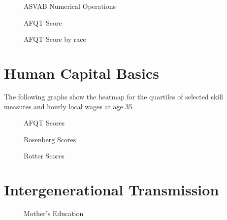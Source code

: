 \begin{figure}[htp]\centering
\caption{ASVAB Numerical Operations}
\end{figure}

\begin{figure}[htp]\centering
\caption{AFQT Score}
\end{figure}

\begin{figure}[htp]\centering
\caption{AFQT Score by race}
\end{figure}
\FloatBarrier\section{Human Capital Basics}
The following graphs show the heatmap for the quartiles of selected skill measures and hourly local wages at age 35.

\begin{figure}[htp]\centering
\caption{AFQT Scores}
\end{figure}

\begin{figure}[htp]\centering
\caption{Rosenberg Scores}
\end{figure}

\begin{figure}[htp]\centering
\caption{Rotter Scores}
\end{figure}

\FloatBarrier\section{Intergenerational Transmission}
\begin{figure}[htp]\centering
\caption{Mother's Education}
\end{figure}

